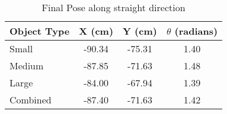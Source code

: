 \begin{table}[H]
\centering
\caption{Final Pose along straight direction}
\label{straight}
\begin{tabular}{|l|c|c|c|}
	\hline
	\multicolumn{1}{|c|}{Object Type} & X (cm) & Y (cm) &  $\theta$ (radians)   \\ \hline
	Small                             & -90.34 & -75.31 & 1.40				    \\ %
	Medium                            & -87.85 & -71.63 & 1.48				    \\ %
	Large                             & -84.00 & -67.94 & 1.39    				\\ \hline
	Combined                          & -87.40 & -71.63 & 1.42				    \\ \hline
\end{tabular}
\end{table}
